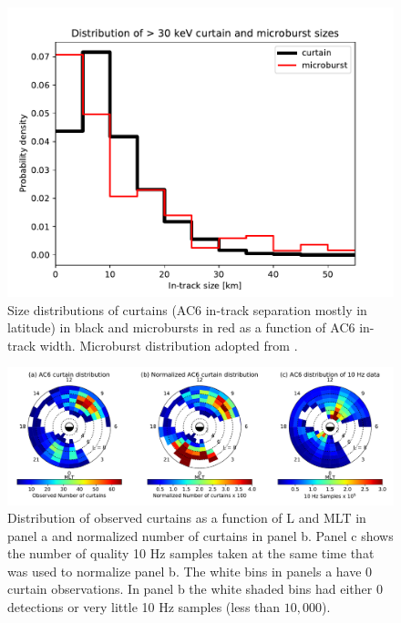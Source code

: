 \documentclass[draft]{agujournal2019}
\begin{document}
\begin{figure}
\includegraphics[width=\textwidth]{ac6_curtain_microburst_width_dist.pdf}
\caption{Size distributions of curtains (AC6 in-track separation mostly in latitude) in black and microbursts in red as a function of AC6 in-track width. Microburst distribution adopted from .}
\label{width_dist}
\end{figure}

\begin{figure}
\includegraphics[width=\textwidth]{fig2_2.pdf}
\caption{Distribution of observed curtains as a function of L and MLT in panel a and normalized number of curtains in panel b. Panel c shows the number of quality 10 Hz samples taken at the same time that was used to normalize panel b. The white bins in panels a have 0 curtain observations. In panel b the white shaded bins had either 0 detections or very little 10 Hz samples (less than $10,000$).}
\label{l_mlt_dist}
\end{figure}
\end{document}
